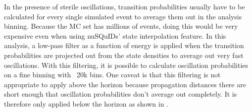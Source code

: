 In the presence of sterile oscillations, transition probabilities usually have to be calculated for every single simulated event to average them out in the analysis binning. Because the MC set has millions of events, doing this would be very expensive even when using nuSQuIDs' state interpolation feature. In this analysis, a low-pass filter as a function of energy is applied when the transition probabilities are projected out from the state densities to average out very fast oscillations. With this filtering, it is possible to calculate oscillation probabilities on a fine binning with ~20k bins. One caveat is that this filtering is not appropriate to apply above the horizon because propagation distances there are short enough that oscillation probabilities don't average out completely. It is therefore only applied below the horizon as shown in .


